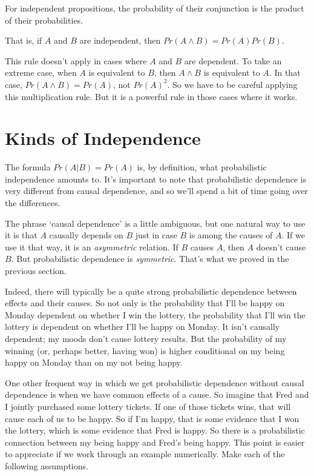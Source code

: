 \begin{itemize*}
\item For independent propositions, the probability of their conjunction is the product of their probabilities.
\item That is, if $A$ and $B$ are independent, then $Pr(A \wedge B) = Pr(A) Pr(B)$.
\end{itemize*}

\noindent This rule doesn't apply in cases where $A$ and $B$ are dependent. To take an extreme case, when $A$ is equivalent to $B$, then $A \wedge B$ is equivalent to $A$. In that case, $Pr(A \wedge B) = Pr(A)$, not $Pr(A)^2$. So we have to be careful applying this multiplication rule. But it is a powerful rule in those cases where it works.

\section{Kinds of Independence}
The formula $Pr(A|B) = Pr(A)$ is, by definition, what probabilistic independence amounts to. It's important to note that probabilistic dependence is very different from causal dependence, and so we'll spend a bit of time going over the differences.

The phrase `causal dependence' is a little ambiguous, but one natural way to use it is that $A$ causally depends on $B$ just in case $B$ is among the causes of $A$. If we use it that way, it is an \textit{asymmetric} relation. If $B$ causes $A$, then $A$ doesn't cause $B$. But probabilistic dependence is \textit{symmetric}. That's what we proved in the previous section.

Indeed, there will typically be a quite strong probabilistic dependence between effects and their causes. So not only is the probability that I'll be happy on Monday dependent on whether I win the lottery, the probability that I'll win the lottery is dependent on whether I'll be happy on Monday. It isn't causally dependent; my moods don't cause lottery results. But the probability of my winning (or, perhaps better, having won) is higher conditional on my being happy on Monday than on my not being happy.

One other frequent way in which we get probabilistic dependence without causal dependence is when we have common effects of a cause. So imagine that Fred and I jointly purchased some lottery tickets. If one of those tickets wins, that will cause each of us to be happy. So if I'm happy, that is some evidence that I won the lottery, which is some evidence that Fred is happy. So there is a probabilistic connection between my being happy and Fred's being happy. This point is easier to appreciate if we work through an example numerically. Make each of the following assumptions.

